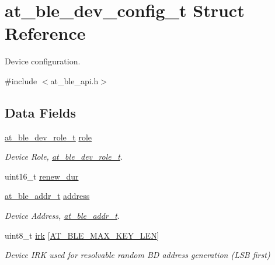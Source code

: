 \hypertarget{structat__ble__dev__config__t}{}\section{at\+\_\+ble\+\_\+dev\+\_\+config\+\_\+t Struct Reference}
\label{structat__ble__dev__config__t}


Device configuration.  




{\ttfamily \#include $<$at\+\_\+ble\+\_\+api.\+h$>$}

\subsection*{Data Fields}
\begin{DoxyCompactItemize}
\item 
\mbox{\hyperlink{at__ble__api_8h_ad15e38aadd54f5fc3ab8a75b35ae476a}{at\+\_\+ble\+\_\+dev\+\_\+role\+\_\+t}} \mbox{\hyperlink{structat__ble__dev__config__t_a6cf060150e1e825208151bf857dd2f08}{role}}
\begin{DoxyCompactList}\small\item\em Device Role, \mbox{\hyperlink{at__ble__api_8h_ad15e38aadd54f5fc3ab8a75b35ae476a}{at\+\_\+ble\+\_\+dev\+\_\+role\+\_\+t}}. \end{DoxyCompactList}\item 
uint16\+\_\+t \mbox{\hyperlink{structat__ble__dev__config__t_a73fd1f4e7ca670060f9433df0eab0fbb}{renew\+\_\+dur}}
\item 
\mbox{\hyperlink{structat__ble__addr__t}{at\+\_\+ble\+\_\+addr\+\_\+t}} \mbox{\hyperlink{structat__ble__dev__config__t_a5030c7408086a88e92da7e836aca17dc}{address}}
\begin{DoxyCompactList}\small\item\em Device Address, \mbox{\hyperlink{structat__ble__addr__t}{at\+\_\+ble\+\_\+addr\+\_\+t}}. \end{DoxyCompactList}\item 
uint8\+\_\+t \mbox{\hyperlink{structat__ble__dev__config__t_a6976ea27c8e6eefa6ee513454dad7faa}{irk}} \mbox{[}\mbox{\hyperlink{at__ble__api_8h_a462eb50567c44d7284308fe058158e99}{A\+T\+\_\+\+B\+L\+E\+\_\+\+M\+A\+X\+\_\+\+K\+E\+Y\+\_\+\+L\+EN}}\mbox{]}
\begin{DoxyCompactList}\small\item\em Device I\+RK used for resolvable random BD address generation (L\+SB first) \end{DoxyCompactList}\item 

\end{DoxyCompactItemize}

